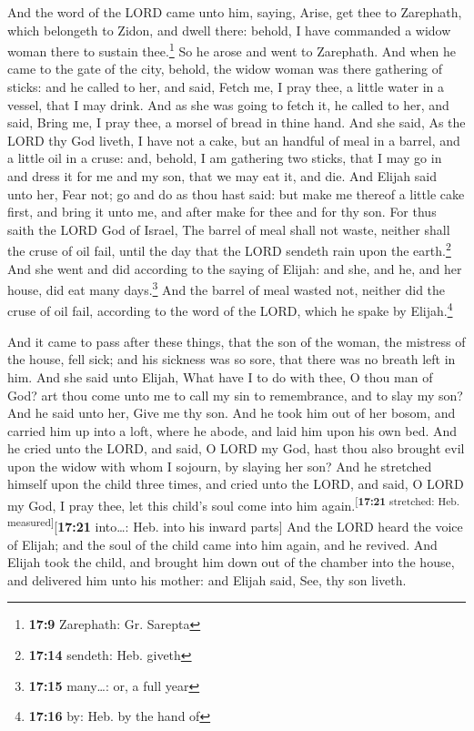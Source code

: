  And the word of the LORD came unto him, saying,
 Arise, get thee to Zarephath, which belongeth to Zidon,
and dwell there: behold, I have commanded a widow woman there to sustain
thee.\footnote{\textbf{17:9} Zarephath: Gr. Sarepta}  So
he arose and went to Zarephath. And when he came to the gate of the
city, behold, the widow woman was there gathering of sticks: and he
called to her, and said, Fetch me, I pray thee, a little water in a
vessel, that I may drink.  And as she was going to fetch
it, he called to her, and said, Bring me, I pray thee, a morsel of bread
in thine hand.  And she said, As the LORD thy God liveth,
I have not a cake, but an handful of meal in a barrel, and a little oil
in a cruse: and, behold, I am gathering two sticks, that I may go in and
dress it for me and my son, that we may eat it, and die. 
And Elijah said unto her, Fear not; go and do as thou hast said: but
make me thereof a little cake first, and bring it unto me, and after
make for thee and for thy son.  For thus saith the LORD
God of Israel, The barrel of meal shall not waste, neither shall the
cruse of oil fail, until the day that the LORD sendeth rain upon the
earth.\footnote{\textbf{17:14} sendeth: Heb. giveth}  And
she went and did according to the saying of Elijah: and she, and he, and
her house, did eat many days.\footnote{\textbf{17:15} many\ldots: or, a
  full year}  And the barrel of meal wasted not, neither
did the cruse of oil fail, according to the word of the LORD, which he
spake by Elijah.\footnote{\textbf{17:16} by: Heb. by the hand of}

 And it came to pass after these things, that the son of
the woman, the mistress of the house, fell sick; and his sickness was so
sore, that there was no breath left in him.  And she said
unto Elijah, What have I to do with thee, O thou man of God? art thou
come unto me to call my sin to remembrance, and to slay my son?
 And he said unto her, Give me thy son. And he took him
out of her bosom, and carried him up into a loft, where he abode, and
laid him upon his own bed.  And he cried unto the LORD,
and said, O LORD my God, hast thou also brought evil upon the widow with
whom I sojourn, by slaying her son?  And he stretched
himself upon the child three times, and cried unto the LORD, and said, O
LORD my God, I pray thee, let this child's soul come into him
again.\textsuperscript{{[}\textbf{17:21} stretched: Heb.
measured{]}}{[}\textbf{17:21} into\ldots: Heb. into his inward parts{]}
 And the LORD heard the voice of Elijah; and the soul of
the child came into him again, and he revived.  And
Elijah took the child, and brought him down out of the chamber into the
house, and delivered him unto his mother: and Elijah said, See, thy son
liveth.


